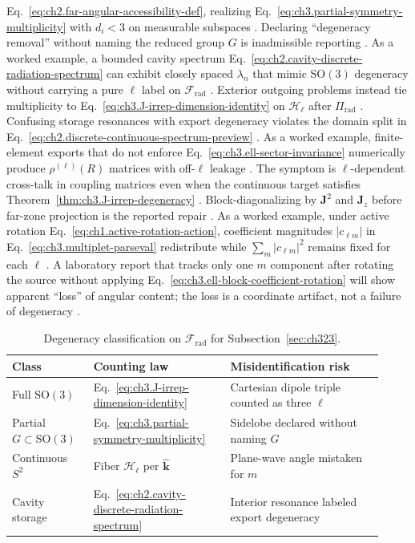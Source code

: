 Eq.~\eqref{eq:ch2.far-angular-accessibility-def}, realizing
Eq.~\eqref{eq:ch3.partial-symmetry-multiplicity} with \(d_i<3\) on measurable subspaces
\cite{harrington2001}. Declaring ``degeneracy removal'' without naming the reduced group \(G\) is
inadmissible reporting \cite{stratton1941}.
As a worked example, a bounded cavity spectrum Eq.~\eqref{eq:ch2.cavity-discrete-radiation-spectrum} can exhibit closely spaced
\(\lambda_n\) that mimic \(\mathrm{SO}(3)\) degeneracy without carrying a pure \(\ell\) label on
\(\mathcal{F}_{\mathrm{rad}}\) \cite{harrington2001}. Exterior outgoing problems instead tie
multiplicity to Eq.~\eqref{eq:ch3.J-irrep-dimension-identity} on \(\mathcal{H}_{\ell}\) after
\(\Pi_{\mathrm{rad}}\) \cite{stratton1941}. Confusing storage resonances with export degeneracy violates
the domain split in Eq.~\eqref{eq:ch2.discrete-continuous-spectrum-preview} \cite{harrington2001}.
As a worked example, finite-element exports that do not enforce Eq.~\eqref{eq:ch3.ell-sector-invariance} numerically produce
\(\rho^{(\ell)}(R)\) matrices with off-\(\ell\) leakage \cite{harrington2001}. The symptom is
\(\ell\)-dependent cross-talk in coupling matrices even when the continuous target satisfies
Theorem~\ref{thm:ch3.J-irrep-degeneracy} \cite{stratton1941}. Block-diagonalizing by
\(\mathbf{J}^{2}\) and \(\mathbf{J}_{z}\) before far-zone projection is the reported repair
\cite{hansen1988}.
As a worked example, under active rotation Eq.~\eqref{eq:ch1.active-rotation-action}, coefficient magnitudes
\(|c_{\ell m}|\) in Eq.~\eqref{eq:ch3.multiplet-parseval} redistribute while
\(\sum_{m}|c_{\ell m}|^{2}\) remains fixed for each \(\ell\) \cite{stratton1941}. A laboratory
report that tracks only one \(m\) component after rotating the source without applying
Eq.~\eqref{eq:ch3.ell-block-coefficient-rotation} will show apparent ``loss'' of angular content; the loss is a
coordinate artifact, not a failure of degeneracy \cite{harrington2001}.
\begin{table}[t]
\centering
\caption{Degeneracy classification on \(\mathcal{F}_{\mathrm{rad}}\) for Subsection~\ref{sec:ch323}.}
\label{tab:ch3.SO3-degeneracy-classification}
\small
\begin{tabular}{@{}p{0.20\linewidth}p{0.34\linewidth}p{0.38\linewidth}@{}}
\toprule
Class & Counting law & Misidentification risk \\
\midrule
Full \(\mathrm{SO}(3)\) &
Eq.~\eqref{eq:ch3.J-irrep-dimension-identity} &
Cartesian dipole triple counted as three \(\ell\) \\
\addlinespace
Partial \(G\subset\mathrm{SO}(3)\) &
Eq.~\eqref{eq:ch3.partial-symmetry-multiplicity} &
Sidelobe declared without naming \(G\) \\
\addlinespace
Continuous \(S^{2}\) &
Fiber \(\mathcal{H}_{\ell}\) per \(\hat{\mathbf{k}}\) &
Plane-wave angle mistaken for \(m\) \\
\addlinespace
Cavity storage &
Eq.~\eqref{eq:ch2.cavity-discrete-radiation-spectrum} &
Interior resonance labeled export degeneracy \\
\bottomrule
\end{tabular}
\end{table}
